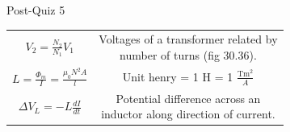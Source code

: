 \documentclass{article}
\begin{document}
\begin{center}
\begin{section}{Post-Quiz 5}
\begin{tabular}{|c|c|}
		 $V_2 = \frac{N_2}{N_1} V_1$                                                   & \makecell{Voltages of a transformer related by           \\
		 number of turns (fig 30.36).}                                                                                                            \\

		 $L = \frac{\Phi_m}{I} = \frac{\mu_0 N^2 A}{l}$                                & Unit henry = 1 H = 1 $\frac{\text{Tm}^2}{A}$             \\

		 $\Delta V_L = -L \frac{dI}{dt}$                                               & \makecell{Potential difference across an                 \\
		 inductor along direction of current.}                                                                                                    \\


\end{tabular}
\end{section}
\end{center}
\end{document}
